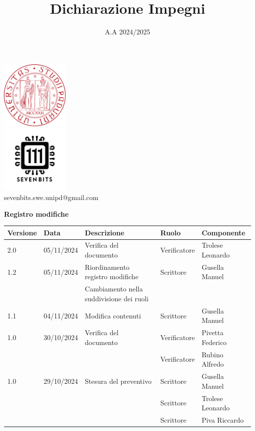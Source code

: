 \documentclass[10pt]{article}
\title{Dichiarazione Impegni}
\date{A.A 2024/2025}
\begin{document}
\maketitle
\begin{center}
\includegraphics[width=0.25\textwidth]{LogoUnipd}\\
\includegraphics[width=0.25\textwidth]{Sevenbitslogo}\\
sevenbits.swe.unipd@gmail.com\\
\vspace{2mm}

\textbf{Registro modifiche}\\
\vspace{2mm}
\begin{tabular}{|l|l|l|l|l|}
\hline
\textbf{Versione} & \textbf{Data} & \textbf{Descrizione} & \textbf{Ruolo} & \textbf{Componente} \\
\hline
2.0 & 05/11/2024 & Verifica del documento & Verificatore & Trolese Leonardo\\
\hline
1.2 & 05/11/2024 & Riordinamento registro modifiche & Scrittore & Gusella Manuel\\
& & Cambiamento nella suddivisione dei ruoli& &\\ 
\hline
1.1 & 04/11/2024 & Modifica contenuti & Scrittore & Gusella Manuel\\
\hline
1.0 & 30/10/2024 & Verifica del documento & Verificatore & Pivetta Federico\\
& & & Verificatore & Rubino Alfredo\\
\hline
1.0 & 29/10/2024 & Stesura del preventivo & Scrittore & Gusella Manuel\\
& & & Scrittore & Trolese Leonardo\\
& & & Scrittore & Piva Riccardo\\
\hline
\end{tabular}
\end{center}
\newpage
\tableofcontents
\newpage
\end{document}
